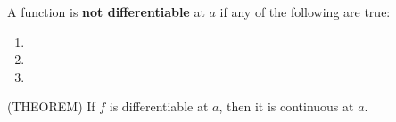 \documentclass[11pt]{article}
\begin{document}
A function is {\bf not differentiable} at $a$ if any of the following are true:

\begin{enumerate}
\item{}

  \vspace{0.5in}

  

\item{}

    \vspace{0.5in}

  
\item{}

    \vspace{0.5in}


  \end{enumerate}

    \vspace{1in}


(THEOREM)  If $f$ is differentiable at $a$, then it is continuous at $a$.
\end{document}
